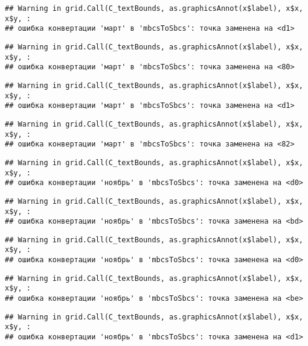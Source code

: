 \documentclass[
]{article}
\begin{document}
\begin{verbatim}
## Warning in grid.Call(C_textBounds, as.graphicsAnnot(x$label), x$x, x$y, :
## ошибка конвертации 'март' в 'mbcsToSbcs': точка заменена на <d1>
\end{verbatim}

\begin{verbatim}
## Warning in grid.Call(C_textBounds, as.graphicsAnnot(x$label), x$x, x$y, :
## ошибка конвертации 'март' в 'mbcsToSbcs': точка заменена на <80>
\end{verbatim}

\begin{verbatim}
## Warning in grid.Call(C_textBounds, as.graphicsAnnot(x$label), x$x, x$y, :
## ошибка конвертации 'март' в 'mbcsToSbcs': точка заменена на <d1>
\end{verbatim}

\begin{verbatim}
## Warning in grid.Call(C_textBounds, as.graphicsAnnot(x$label), x$x, x$y, :
## ошибка конвертации 'март' в 'mbcsToSbcs': точка заменена на <82>
\end{verbatim}

\begin{verbatim}
## Warning in grid.Call(C_textBounds, as.graphicsAnnot(x$label), x$x, x$y, :
## ошибка конвертации 'ноябрь' в 'mbcsToSbcs': точка заменена на <d0>
\end{verbatim}

\begin{verbatim}
## Warning in grid.Call(C_textBounds, as.graphicsAnnot(x$label), x$x, x$y, :
## ошибка конвертации 'ноябрь' в 'mbcsToSbcs': точка заменена на <bd>
\end{verbatim}

\begin{verbatim}
## Warning in grid.Call(C_textBounds, as.graphicsAnnot(x$label), x$x, x$y, :
## ошибка конвертации 'ноябрь' в 'mbcsToSbcs': точка заменена на <d0>
\end{verbatim}

\begin{verbatim}
## Warning in grid.Call(C_textBounds, as.graphicsAnnot(x$label), x$x, x$y, :
## ошибка конвертации 'ноябрь' в 'mbcsToSbcs': точка заменена на <be>
\end{verbatim}

\begin{verbatim}
## Warning in grid.Call(C_textBounds, as.graphicsAnnot(x$label), x$x, x$y, :
## ошибка конвертации 'ноябрь' в 'mbcsToSbcs': точка заменена на <d1>
\end{verbatim}
\end{document}
